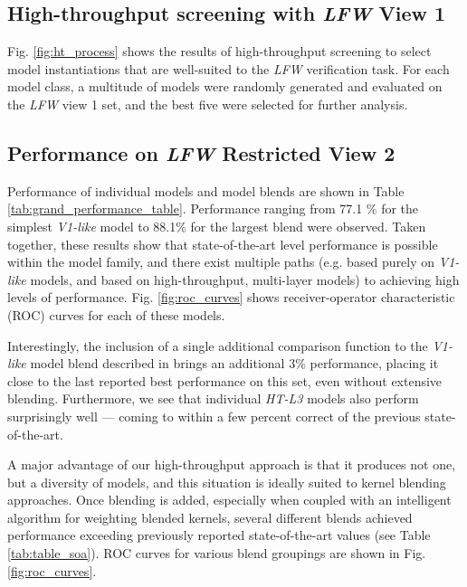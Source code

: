 


\subsection{High-throughput screening with \emph{LFW} View 1}

Fig. \ref{fig:ht_process} shows the results of high-throughput screening to select
model instantiations that are well-suited to the \emph{LFW} verification task.
For each model class, a multitude of models were randomly generated and
evaluated on the \emph{LFW} view 1 set, and the best five were selected for
further analysis.


\subsection{Performance on \emph{LFW} Restricted View 2}

Performance of individual models and model blends are shown in Table
\ref{tab:grand_performance_table}.  Performance ranging from 77.1 \% for the
simplest \emph{V1-like} model to 88.1\% for the largest blend were observed.  Taken
together, these results show that state-of-the-art level performance is possible
within the model family, and there exist multiple paths (e.g. based purely
on \emph{V1-like} models, and based on high-throughput, multi-layer models) to
achieving high levels of performance.  Fig. \ref{fig:roc_curves} shows
receiver-operator characteristic (ROC) curves for each of these models.

Interestingly, the inclusion of a single additional comparison function to the
\emph{V1-like} model blend described in \cite{pinto:cvpr09} brings an additional
3\% performance, placing it close to the last reported best performance on this
set, even without extensive blending.  Furthermore, we see that individual
\emph{HT-L3} models also perform surprisingly well --- coming to within a few percent correct of
the previous state-of-the-art.

A major advantage of our high-throughput approach is that it produces not one,
but a diversity of models, and this situation is ideally suited to kernel
blending approaches.  Once blending is added, especially when coupled with an
intelligent algorithm for weighting blended kernels, several different blends
achieved performance exceeding previously reported state-of-the-art values (see Table \ref{tab:table_soa}).  ROC
curves for various blend groupings are shown in Fig. \ref{fig:roc_curves}.

